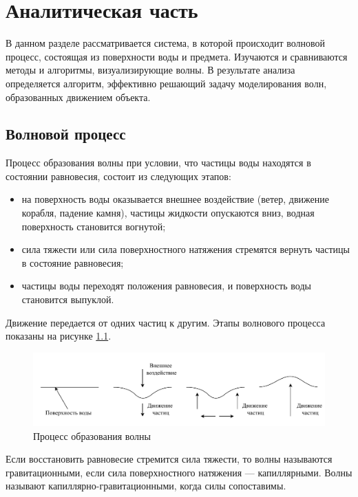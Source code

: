 \chapter{Аналитическая часть}

В данном разделе рассматривается система, в которой происходит волновой процесс, состоящая из поверхности воды и предмета. Изучаются и сравниваются методы и алгоритмы, визуализирующие волны. В результате анализа определяется алгоритм, эффективно решающий задачу моделирования волн, образованных движением объекта.

\section{Волновой процесс}

Процесс образования волны при условии, что частицы воды находятся в состоянии равновесия, состоит из следующих этапов:

\begin{itemize}
	\item на поверхность воды оказывается внешнее воздействие (ветер, движение корабля, падение камня), частицы жидкости опускаются вниз, водная поверхность становится вогнутой;
	\item сила тяжести или сила поверхностного натяжения стремятся вернуть частицы в состояние равновесия;
	\item частицы воды переходят положения равновесия, и поверхность воды становится выпуклой.
\end{itemize}

Движение передается от одних частиц к другим. Этапы волнового процесса показаны на рисунке \ref{img:wave-process}.

\begin{figure}[H]
	\begin{center}
		\includegraphics[scale=0.8]{img/wave-process.pdf}
	\end{center}
	\captionsetup{justification=centering}
	\caption{Процесс образования волны}
	\label{img:wave-process}
\end{figure}

Если восстановить равновесие стремится сила тяжести, то волны называются гравитационными, если сила поверхностного натяжения --- капиллярными. Волны называют капиллярно-гравитационными, когда силы сопоставимы.

